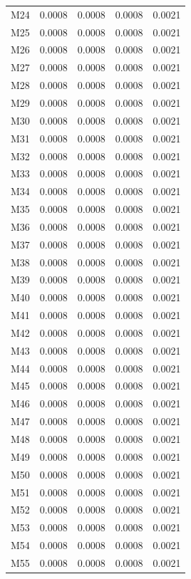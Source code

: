 \begin{longtable}{lrrrr}
M24 & 0.0008 & 0.0008 & 0.0008 & 0.0021 \\
M25 & 0.0008 & 0.0008 & 0.0008 & 0.0021 \\
M26 & 0.0008 & 0.0008 & 0.0008 & 0.0021 \\
M27 & 0.0008 & 0.0008 & 0.0008 & 0.0021 \\
M28 & 0.0008 & 0.0008 & 0.0008 & 0.0021 \\
M29 & 0.0008 & 0.0008 & 0.0008 & 0.0021 \\
M30 & 0.0008 & 0.0008 & 0.0008 & 0.0021 \\
M31 & 0.0008 & 0.0008 & 0.0008 & 0.0021 \\
M32 & 0.0008 & 0.0008 & 0.0008 & 0.0021 \\
M33 & 0.0008 & 0.0008 & 0.0008 & 0.0021 \\
M34 & 0.0008 & 0.0008 & 0.0008 & 0.0021 \\
M35 & 0.0008 & 0.0008 & 0.0008 & 0.0021 \\
M36 & 0.0008 & 0.0008 & 0.0008 & 0.0021 \\
M37 & 0.0008 & 0.0008 & 0.0008 & 0.0021 \\
M38 & 0.0008 & 0.0008 & 0.0008 & 0.0021 \\
M39 & 0.0008 & 0.0008 & 0.0008 & 0.0021 \\
M40 & 0.0008 & 0.0008 & 0.0008 & 0.0021 \\
M41 & 0.0008 & 0.0008 & 0.0008 & 0.0021 \\
M42 & 0.0008 & 0.0008 & 0.0008 & 0.0021 \\
M43 & 0.0008 & 0.0008 & 0.0008 & 0.0021 \\
M44 & 0.0008 & 0.0008 & 0.0008 & 0.0021 \\
M45 & 0.0008 & 0.0008 & 0.0008 & 0.0021 \\
M46 & 0.0008 & 0.0008 & 0.0008 & 0.0021 \\
M47 & 0.0008 & 0.0008 & 0.0008 & 0.0021 \\
M48 & 0.0008 & 0.0008 & 0.0008 & 0.0021 \\
M49 & 0.0008 & 0.0008 & 0.0008 & 0.0021 \\
M50 & 0.0008 & 0.0008 & 0.0008 & 0.0021 \\
M51 & 0.0008 & 0.0008 & 0.0008 & 0.0021 \\
M52 & 0.0008 & 0.0008 & 0.0008 & 0.0021 \\
M53 & 0.0008 & 0.0008 & 0.0008 & 0.0021 \\
M54 & 0.0008 & 0.0008 & 0.0008 & 0.0021 \\
M55 & 0.0008 & 0.0008 & 0.0008 & 0.0021 \\

\end{longtable}
